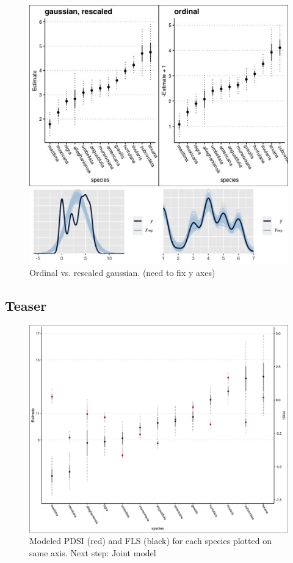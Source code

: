 \documentclass[12pt]{article}\usepackage[]{graphicx}\usepackage[]{color}
\begin{document}
       \begin{figure}[h!]
        \centering
         \includegraphics[width=\textwidth]{..//Plots/ordinal_reg.jpeg}
                 \caption{Ordinal vs. rescaled gaussian. (need to fix y axes)}
    \end{figure}

\subsection*{Teaser}
   \begin{figure}[h!]
        \centering
         \includegraphics[width=\textwidth]{..//Plots/pdsi.jpeg}
                 \caption{Modeled PDSI (red) and FLS (black) for each species plotted on same axis. Next step: Joint model}
    \end{figure}
\end{document}
